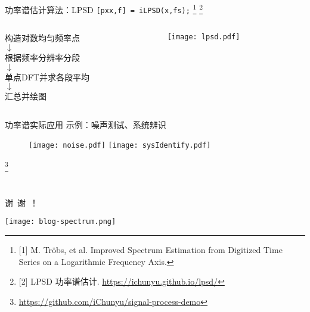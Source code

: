 \documentclass[UTF8]{ctexbeamer}
\begin{document}
\begin{frame}{功率谱估计算法：LPSD}
    \texttt{[pxx,f] = iLPSD(x,fs);}
    \footnote{[1] M. Tröbs, et al. Improved Spectrum Estimation from Digitized Time Series on a Logarithmic Frequency Axis.
    }
    \footnote{[2] LPSD 功率谱估计. \href{https://ichunyu.github.io/lpsd/}{https://ichunyu.github.io/lpsd/}
    }
    
    \vspace{\fill}
    \begin{columns}
        \begin{column}{0.4\textwidth}
            \centering\normalsize
            构造对数均匀频率点 \\
            $\downarrow$ \\
            根据频率分辨率分段 \\
            $\downarrow$ \\
            单点DFT并求各段平均 \\
            $\downarrow$ \\
            汇总并绘图
        \end{column}
        \begin{column}{0.6\textwidth}
            \centering
            \texttt{[image: lpsd.pdf]}
        \end{column}
    \end{columns}
\end{frame}


\begin{frame}{功率谱实际应用}
    示例：噪声测试、系统辨识
    
    \begin{figure}
        \centering
        \texttt{[image: noise.pdf]} 
        \hspace{10pt}
        \texttt{[image: sysIdentify.pdf]} 
    \end{figure}

    \footnote{\href{https://github.com/iChunyu/signal-process-demo}{https://github.com/iChunyu/signal-process-demo}}
\end{frame}



\begin{frame}[standout]
    \ %

    \vspace{\fill}

     谢\ 谢\ ！

    \vspace{\fill}

    \hfill \texttt{[image: blog-spectrum.png]}
\end{frame}
\end{document}
